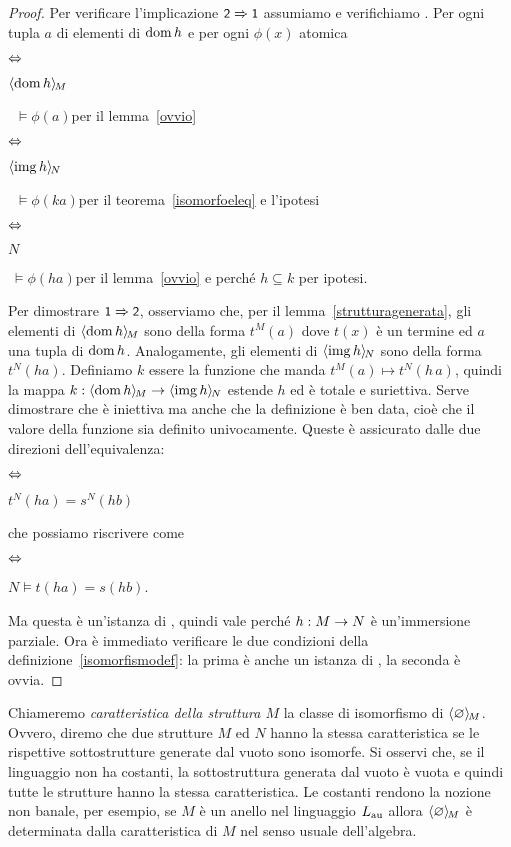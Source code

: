 \begin{proof}
Per verificare l'implicazione $\textsf{\small 2}\Rightarrow\textsf{\small 1}$ assumiamo  e verifichiamo . Per ogni tupla $a$ di elementi di $\mathop{\rm dom} h$ e per ogni $\phi(x)$ atomica

\hspace*{15ex}\parbox{5ex}{\hfil$\Leftrightarrow$}\parbox{10ex}{\hfill$\langle\mathop{\rm dom} h\rangle_{\!M}$}\ $\models \phi(a)$\hfill per il lemma~\ref{ovvio}
 
\hspace*{15ex}\parbox{5ex}{\hfil$\Leftrightarrow$}\parbox{10ex}{\hfill$\langle\mathop{\rm img} h\rangle_{\!N}$}\ $\models \phi(ka)$\hfill per il teorema~\ref{isomorfoeleq} e l'ipotesi

\hspace*{15ex}\parbox{5ex}{\hfil$\Leftrightarrow$}\parbox{10ex}{\hfill$N\ $}$\ \models\phi(ha)$\hfill per il lemma~\ref{ovvio} e perch\'e $h\subseteq k$ per ipotesi.

Per dimostrare $\textsf{\small 1}\Rightarrow\textsf{\small 2}$, osserviamo che, per il lemma~\ref{strutturagenerata}, gli elementi di $\langle\mathop{\rm dom} h\rangle_{\!M}$ sono della forma $t^M(a)$ dove $t(x)$ \`e un termine ed $a$ una tupla di $\mathop{\rm dom} h$. Analogamente, gli elementi di $\langle\mathop{\rm img} h\rangle_{\!N}$ sono della forma $t^N(ha)$. Definiamo $k$ essere la funzione che manda $t^M(a)\mapsto t^N(h\,a)$, quindi la mappa $k:\langle\mathop{\rm dom} h\rangle_{\!M}\rightarrow\langle\mathop{\rm img} h\rangle_{\!N}$ estende $h$ ed \`e totale e suriettiva.  Serve dimostrare che \`e iniettiva ma anche che la definizione \`e ben data, cio\`e che il valore della funzione sia definito univocamente. Queste \`e assicurato dalle due direzioni dell'equivalenza:

\hspace*{15ex}\parbox{6ex}{\hfil$\Leftrightarrow$}$t^N(ha)=s^N(hb)$

che possiamo riscrivere come

\hspace*{15ex}\parbox{6ex}{\hfil$\Leftrightarrow$}$N\models t(ha)=s(hb)$.

Ma questa \`e un'istanza di , quindi vale perch\'e $h:M\rightarrow N$ \`e un'immersione parziale. Ora \`e immediato verificare le due condizioni della definizione~\ref{isomorfismodef}: la prima  \`e anche un istanza di , la seconda \`e ovvia.
\end{proof}

Chiameremo \emph{caratteristica della struttura $M$\/} la classe di isomorfismo di $\langle\varnothing\rangle_{\!M}$. Ovvero, diremo che due strutture $M$ ed $N$ hanno la stessa caratteristica se le rispettive sottostrutture generate dal vuoto sono isomorfe. Si osservi che, se il linguaggio non ha costanti, la sottostruttura generata dal vuoto \`e vuota e quindi tutte le strutture hanno la stessa caratteristica. Le costanti rendono la nozione non banale, per esempio, se $M$ \`e un anello nel linguaggio $L_{\rm au}$ allora $\langle\varnothing\rangle_{\!M}$ \`e determinata dalla caratteristica di $M$ nel senso usuale dell'algebra.

